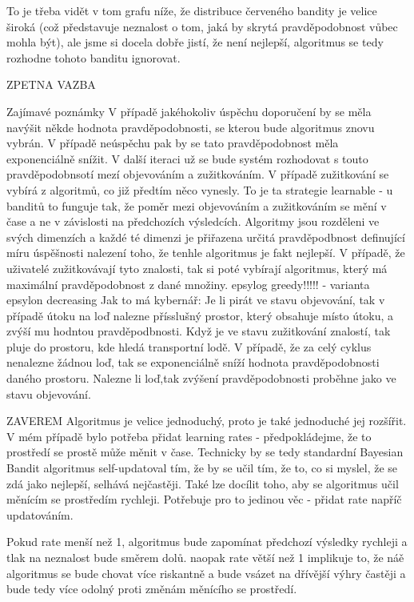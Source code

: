 \documentclass[thesis=M,czech]{FITthesis}[2014/05/07]
\begin{document}
To je třeba vidět v tom grafu níže, že distribuce červeného bandity je velice široká (což představuje neznalost o tom, jaká by skrytá pravděpodobnost vůbec mohla být), ale jsme si docela dobře jistí, že není nejlepší, algoritmus se tedy rozhodne tohoto banditu ignorovat.

ZPETNA VAZBA

Zajímavé poznámky
V případě jakéhokoliv úspěchu doporučení by se měla navýšit někde hodnota pravděpodobnosti, se kterou bude algoritmus znovu vybrán. V případě neúspěchu pak by se tato pravděpodobnost měla exponenciálně snížit. V další iteraci už se bude systém rozhodovat s touto pravděpodobnsotí mezí objevováním a zužitkováním. V případě zužitkování se vybírá z algoritmů, co již předtím něco vynesly. To je ta strategie learnable - u banditů to funguje tak, že poměr mezi objevováním a zužitkováním se mění v čase a ne v závislosti na předchozích výsledcích. Algoritmy jsou rozděleni ve svých dimenzích a každé té dimenzi je přiřazena určitá pravděpodbnost definující míru úspěšnosti nalezení toho, že tenhle algoritmus je fakt nejlepší. V případě, že uživatelé zužitkovávají tyto znalosti, tak si poté vybírají algoritmus, který má maximální pravděpodobnost z dané množiny. 
epsylog greedy!!!!! - varianta  epsylon decreasing
Jak to má kybernář: Je li pirát ve stavu objevování, tak v případě útoku na loď nalezne přísslušný prostor, který obsahuje místo útoku, a zvýší mu hodntou pravděpodbnosti. Když je ve stavu zužitkování znalostí, tak pluje do prostoru, kde hledá transportní lodě. V případě, že za celý cyklus nenalezne žádnou loď, tak se exponenciálně sníží hodnota pravděpodobnosti daného prostoru. Nalezne li loď,tak zvýšení pravděpodobnosti proběhne jako ve stavu objevování. 


ZAVEREM
Algoritmus je velice jednoduchý, proto je také jednoduché jej rozšířit. V mém případě bylo potřeba přidat learning rates - předpokládejme, že to prostředí se prostě může měnit v čase. Technicky by se tedy standardní Bayesian Bandit algoritmus self-updatoval tím, že by se učil tím, že to, co si myslel, že se zdá jako nejlepší, selhává nejčastěji. Také lze docílit toho, aby se algoritmus učil měnícím se prostředím rychleji. Potřebuje pro to jedinou věc - přidat rate napříč updatováním.

Pokud rate menší než 1, algoritmus bude zapomínat předchozí výsledky rychleji a tlak na neznalost bude směrem dolů. naopak rate větší než 1 implikuje to, že náě algoritmus se bude chovat více riskantně a bude vsázet na dřívější výhry častěji a bude tedy více odolný proti změnám měnícího se prostředí.
		
\end{document}
